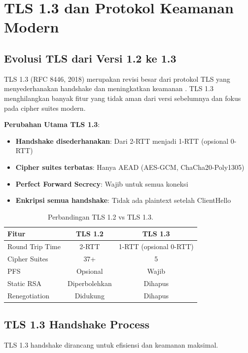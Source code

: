﻿\section{TLS 1.3 dan Protokol Keamanan Modern}

\subsection{Evolusi TLS dari Versi 1.2 ke 1.3}

TLS 1.3 (RFC 8446, 2018) merupakan revisi besar dari protokol TLS yang menyederhanakan handshake dan meningkatkan keamanan \cite{rfc8446}. TLS 1.3 menghilangkan banyak fitur yang tidak aman dari versi sebelumnya dan fokus pada cipher suites modern.

\textbf{Perubahan Utama TLS 1.3}:
\begin{itemize}
  \item \textbf{Handshake disederhanakan}: Dari 2-RTT menjadi 1-RTT (opsional 0-RTT)
  \item \textbf{Cipher suites terbatas}: Hanya AEAD (AES-GCM, ChaCha20-Poly1305)
  \item \textbf{Perfect Forward Secrecy}: Wajib untuk semua koneksi
  \item \textbf{Enkripsi semua handshake}: Tidak ada plaintext setelah ClientHello
\end{itemize}

\begin{table}[htbp]
  \centering
  \small
  \begin{tabular}{lcc}
    \toprule
    Fitur & TLS 1.2 & TLS 1.3 \\
    \midrule
    Round Trip Time & 2-RTT & 1-RTT (opsional 0-RTT) \\
    Cipher Suites & 37+ & 5 \\
    PFS & Opsional & Wajib \\
    Static RSA & Diperbolehkan & Dihapus \\
    Renegotiation & Didukung & Dihapus \\
    \bottomrule
  \end{tabular}
  \caption{Perbandingan TLS 1.2 vs TLS 1.3.}
\end{table}

\subsection{TLS 1.3 Handshake Process}

TLS 1.3 handshake dirancang untuk efisiensi dan keamanan maksimal.


